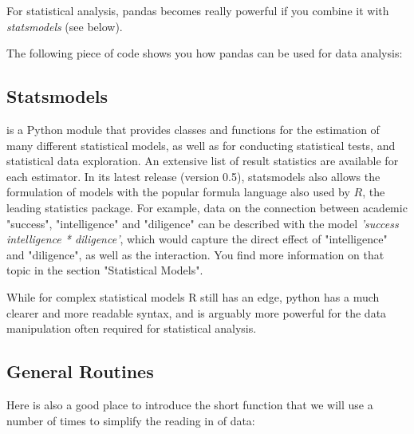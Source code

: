 For statistical analysis, pandas becomes really powerful if you combine it with \emph{statsmodels} (see below).

The following piece of code shows you how pandas can be used for data analysis:



\subsection{Statsmodels}

\cite{statsmodels} is a Python module that provides classes and functions for the estimation of many different statistical models, as well as for conducting statistical tests, and statistical data exploration. An extensive list of result statistics are available for each estimator. In its latest release (version 0.5), statsmodels also allows the formulation of models with the popular formula language also used by $R$, the leading statistics package. For example, data on the connection between academic "success", "intelligence" and "diligence" can be described with the model \emph{'success ~ intelligence * diligence'}, which would capture the direct effect of "intelligence" and "diligence", as well as the interaction. You find more information on that topic in the section "Statistical Models".

While for complex statistical models R still has an edge, python has a much clearer and more readable syntax, and is arguably more powerful for the data manipulation often required for statistical analysis.

\subsection{General Routines}

Here is also a good place to introduce the short function that we will use a number of times to simplify the reading in of data:


